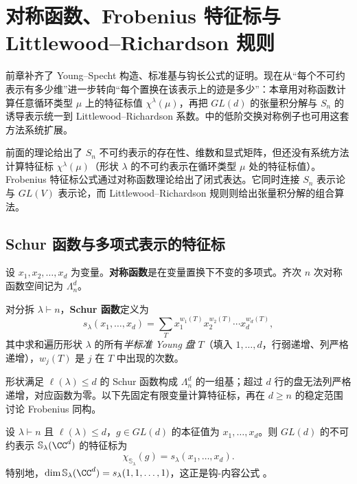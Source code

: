 \chapter{对称函数、Frobenius 特征标与 Littlewood--Richardson 规则}
\label{app:symmetric-functions}

前章补齐了 Young--Specht 构造、标准基与钩长公式的证明。现在从“每个不可约表示有多少维”进一步转向“每个置换在该表示上的迹是多少”：本章用对称函数计算任意循环类型 $\mu$ 上的特征标值 $\chi^\lambda(\mu)$，再把 $GL(d)$ 的张量积分解与 $S_n$ 的诱导表示统一到 Littlewood--Richardson 系数。中的低阶交换对称例子也可用这套方法系统扩展。

前面的理论给出了 $S_n$ 不可约表示的存在性、维数和显式矩阵，但还没有系统方法计算特征标 $\chi^\lambda(\mu)$（形状 $\lambda$ 的不可约表示在循环类型 $\mu$ 处的特征标值）。Frobenius 特征标公式通过对称函数理论给出了闭式表达。它同时连接 $S_n$ 表示论与 $GL(V)$ 表示论，而 Littlewood--Richardson 规则则给出张量积分解的组合算法。

\section{Schur 函数与多项式表示的特征标}

\begin{definition}
设 $x_1,x_2,\dots,x_d$ 为变量。\textbf{对称函数}是在变量置换下不变的多项式。齐次 $n$ 次对称函数空间记为 $\Lambda_n^d$。

对分拆 $\lambda\vdash n$，\textbf{Schur 函数}定义为
\begin{equation}
s_\lambda(x_1,\dots,x_d)
=\sum_T x_1^{w_1(T)}x_2^{w_2(T)}\cdots x_d^{w_d(T)},
\label{eq:schur-function}
\end{equation}
其中求和遍历形状 $\lambda$ 的所有\emph{半标准 Young 盘} $T$（填入 $1,\dots,d$，行弱递增、列严格递增），$w_j(T)$ 是 $j$ 在 $T$ 中出现的次数。
\label{def:schur-function}
\end{definition}

形状满足 $\ell(\lambda)\le d$ 的 Schur 函数构成 $\Lambda_n^d$ 的一组基；超过 $d$ 行的盘无法列严格递增，对应函数为零。以下先固定有限变量计算特征标，再在 $d\ge n$ 的稳定范围讨论 Frobenius 同构。

\begin{theorem}
设 $\lambda\vdash n$ 且 $\ell(\lambda)\le d$，$g\in GL(d)$ 的本征值为 $x_1,\dots,x_d$。则 $GL(d)$ 的不可约表示 $\mathbb{S}_\lambda(\CC^d)$ 的特征标为
\begin{equation}
\chi_{\mathbb{S}_\lambda}(g)=s_\lambda(x_1,\dots,x_d).
\label{eq:schur-gl-character}
\end{equation}
特别地，$\dim\mathbb{S}_\lambda(\CC^d)=s_\lambda(1,1,\dots,1)$，这正是钩-内容公式 。
\label{thm:schur-gl-character}
\end{theorem}

